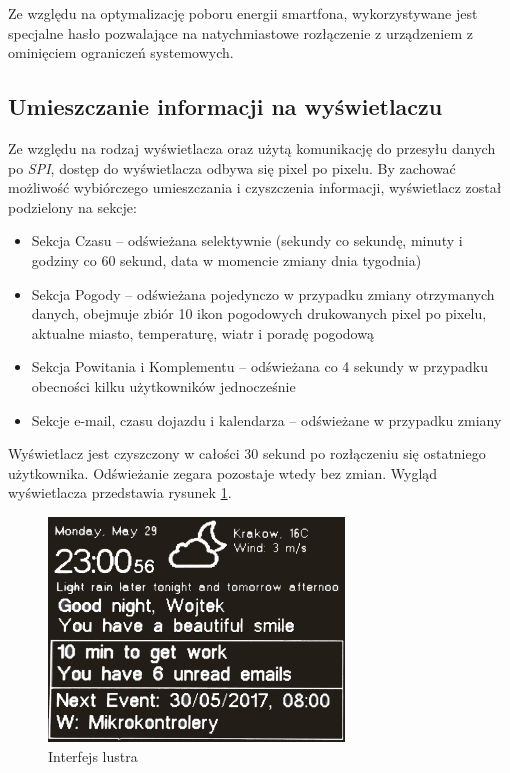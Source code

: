 \documentclass[a4paper,11pt]{article}
\begin{document}
Ze względu na optymalizację poboru energii smartfona, wykorzystywane jest specjalne hasło pozwalające na natychmiastowe rozłączenie z urządzeniem z ominięciem ograniczeń systemowych.

\subsection{Umieszczanie informacji na wyświetlaczu}
Ze względu na rodzaj wyświetlacza oraz użytą komunikację do przesyłu danych po \textit{SPI}, dostęp do wyświetlacza odbywa się pixel po pixelu. By zachować możliwość wybiórczego umieszczania i czyszczenia informacji, wyświetlacz został podzielony na sekcje:
\begin{itemize}
	\item Sekcja Czasu -- odświeżana selektywnie (sekundy co sekundę, minuty i godziny co 60 sekund, data w momencie zmiany dnia tygodnia)
	\item Sekcja Pogody -- odświeżana pojedynczo w przypadku zmiany otrzymanych danych, obejmuje zbiór 10 ikon pogodowych drukowanych pixel po pixelu, aktualne miasto, temperaturę, wiatr i poradę pogodową
	\item Sekcja Powitania i Komplementu -- odświeżana co 4 sekundy w przypadku obecności kilku użytkowników jednocześnie
	\item Sekcje e-mail, czasu dojazdu i kalendarza -- odświeżane w przypadku zmiany	
\end{itemize}

Wyświetlacz jest czyszczony w całości 30 sekund po rozłączeniu się ostatniego użytkownika. Odświeżanie zegara pozostaje wtedy bez zmian. Wygląd wyświetlacza przedstawia rysunek \ref{nrf_interface}.

\begin{figure}[H]
	\includegraphics[width=0.7\textwidth,center]{nrf_interface}
	\caption {Interfejs lustra}
	\label{nrf_interface}
\end{figure}
\end{document}
